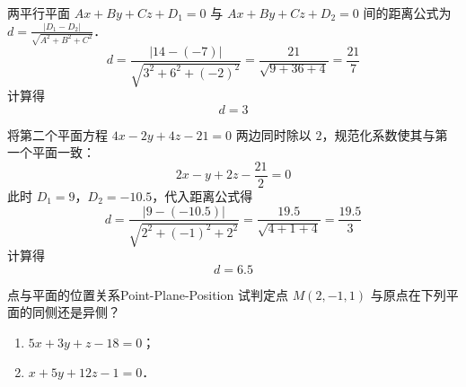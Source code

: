 \begin{solution}

    两平行平面 $Ax + By + Cz + D_1 = 0$ 与 $Ax + By + Cz + D_2 = 0$ 间的距离公式为 $d = \frac{|D_1 - D_2|}{\sqrt{A^2 + B^2 + C^2}}$．
    \begin{equation}
        d = \frac{|14 - (-7)|}{\sqrt{3^2 + 6^2 + (-2)^2}} = \frac{21}{\sqrt{9 + 36 + 4}} = \frac{21}{7}
    \end{equation}
    计算得
    \begin{equation}
        \boxed{d = 3}
    \end{equation}


    将第二个平面方程 $4x - 2y + 4z - 21 = 0$ 两边同时除以 $2$，规范化系数使其与第一个平面一致：
    \begin{equation}
        2x - y + 2z - \frac{21}{2} = 0
    \end{equation}
    此时 $D_1 = 9$，$D_2 = -10.5$，代入距离公式得
    \begin{equation}
        d = \frac{|9 - (-10.5)|}{\sqrt{2^2 + (-1)^2 + 2^2}} = \frac{19.5}{\sqrt{4 + 1 + 4}} = \frac{19.5}{3}
    \end{equation}
    计算得
    \begin{equation}
        \boxed{d = 6.5}
    \end{equation}
\end{solution}


\begin{problem}{点与平面的位置关系}{Point-Plane-Position}
    试判定点 $M(2, -1, 1)$ 与原点在下列平面的同侧还是异侧？
    \begin{enumerate}
        \item $5x + 3y + z - 18 = 0$；
        \item $x + 5y + 12z - 1 = 0$．
    \end{enumerate}
\end{problem}


